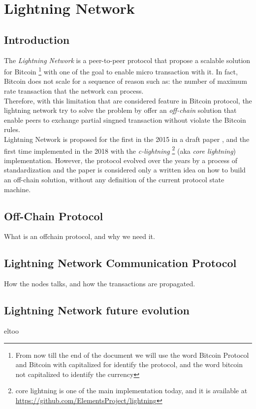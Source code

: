 \setcounter{page}{1}
\chapter{Lightning Network}

\newcommand{\noteOnBitcoinNaming}[0]{
    \footnote{
        From now till the end of the document we will use the word Bitcoin Protocol and
        Bitcoin with capitalized for identify the protocol, and the word bitcoin not capitalized to identify the currency
    }
}

\newcommand{\noteOnCLNImpl}[0]{
    \footnote{
    core lightning is one of the main implementation today, and it is available at
    {\href{https://github.com/ElementsProject/lightning}{https://github.com/ElementsProject/lightning}}
    }
}



\section{Introduction}

The \emph{Lightning Network} is a peer-to-peer protocol that propose a scalable solution for Bitcoin\noteOnBitcoinNaming with
one of the goal to enable micro transaction with it. In fact, Bitcoin does not scale for a sequence of reason such as: the number of
maximum rate transaction that the network can process.\\
Therefore, with this limitation that are considered feature in Bitcoin protocol, the lightning network try to solve
the problem by offer an \emph{off-chain} solution that enable peers to exchange partial
singned transaction without violate the Bitcoin rules.\\
Lightning Network is proposed for the first in the 2015 in a draft paper \cite{lightning-network-paper},
and the first time implemented in the 2018 with the \emph{c-lightning}\noteOnCLNImpl (aka \emph{core lightning}) implementation.
However, the protocol evolved over the years by a process of standardization\cite{lightning-bolts} and the paper is considered
only a written idea on how to build an off-chain solution, without any definition of the current protocol state machine.

\section{Off-Chain Protocol}
What is an offchain protocol, and why we need it.

\section{Lightning Network Communication Protocol}

How the nodes talks, and how the transactions are propagated.

\section{Lightning Network future evolution}
eltoo